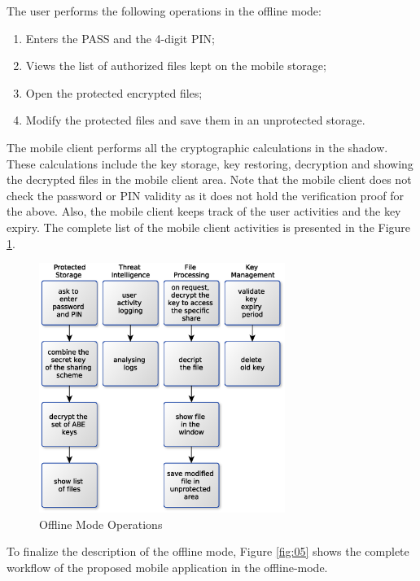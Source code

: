 \documentclass[twocolumn]{svjour3}          	%
\begin{document}
The user performs the following operations in the offline mode:

\begin{enumerate}
	\item Enters the PASS and the 4-digit PIN;
	\item Views the list of authorized files kept on the mobile storage;
	\item Open the protected encrypted files;
	\item Modify the protected files and save them in an unprotected storage.
\end{enumerate}

The mobile client performs all the cryptographic calculations in the shadow. These calculations include the key storage, key restoring, decryption and showing the decrypted files in the mobile client area. Note that the mobile client does not check the password or PIN validity as it does not hold the verification proof for the above. Also, the mobile client keeps track of the user activities and the key expiry. The complete list of the mobile client activities is presented in the Figure \ref{fig:04}.

\begin{figure}[h!]
	\centering
	\includegraphics[width=8cm]{fig04.eps}
	\caption{Offline Mode Operations}
	\label{fig:04}
\end{figure}

To finalize the description of the offline mode, Figure \ref{fig:05} shows the complete workflow of the proposed mobile application in the offline-mode.
\end{document}
